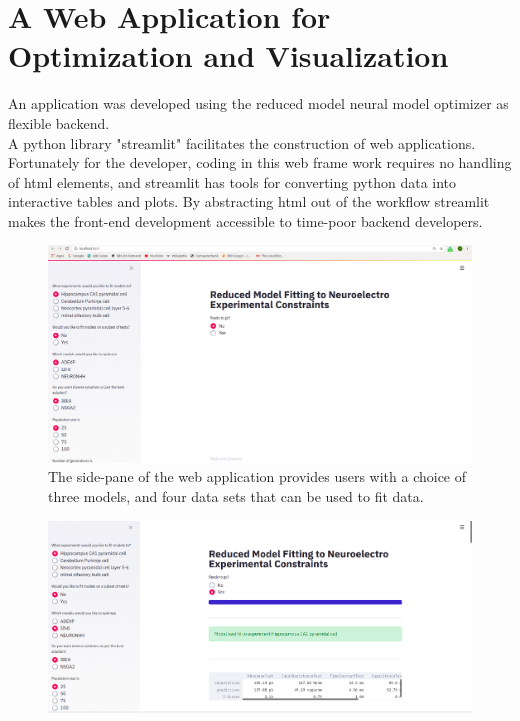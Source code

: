 \section{A Web Application for Optimization and Visualization}
\label{sec:web-app}
An application was developed using the reduced model neural model optimizer as flexible backend. %
\\
A python library "streamlit" facilitates the construction of web applications. Fortunately for the developer, coding in this web frame work requires no handling of html elements, and streamlit has tools for converting python data into interactive tables and plots. By abstracting html out of the workflow streamlit makes the front-end development accessible to time-poor backend developers.\\
\begin{figure}
\begin{center}

\includegraphics[scale=1]{chapters/app_tex/web_app_thesis}
\caption{The side-pane of the web application provides users with a choice of three models, and four data sets that can be used to fit data.
}
\end{center}

\end{figure}
\begin{figure}
\begin{center}

\includegraphics[scale=1]{chapters/app_tex/app_results}
\end{center}

\end{figure}


